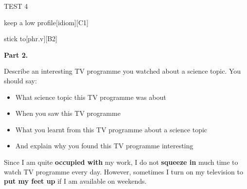 \begin{glossarymc}[Cambridge 15]
\begin{test}{TEST 4}
\begin{VocabExplain}[Part 1]
            \begin{ExplainCard}{keep a low profile}[idiom][C1]
            \end{ExplainCard}

            \begin{ExplainCard}{stick to}[phr.v][B2]
            \end{ExplainCard}
        \end{VocabExplain}

    \noindent
    \textbf{Part 2.}
    \begin{qa}{Describe an interesting TV programme you watched about a science topic. You should say:}
    \begin{itemize}
    \item What science topic this TV programme was about
    \item When you saw this TV programme
    \item What you learnt from this TV programme about a science topic
    \item And explain why you found this TV programme interesting
    \end{itemize}

    Since I am quite \textbf{occupied with} my work, I do not \textbf{squeeze in} much time to watch TV programme every day. However, sometimes I turn on my television to \textbf{put my feet up} if I am available on weekends.


\end{qa}
\end{test}
\end{glossarymc}
